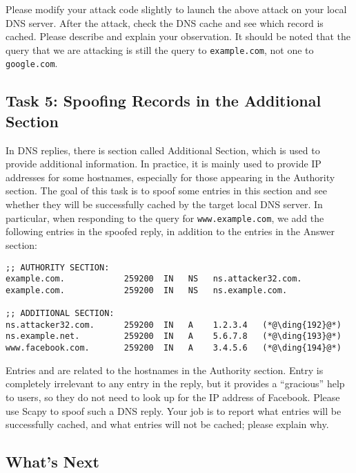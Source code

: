 Please modify your attack code slightly to launch 
the above attack on your local DNS server. After the 
attack, check the DNS cache and see which record is cached.
Please describe and explain your observation. It should be noted that the query
that we are attacking is still the query to \texttt{example.com}, not one
to \texttt{google.com}.  


\subsection{Task 5: Spoofing Records in the Additional Section}

In DNS replies, there is section called Additional Section, which is used
to provide additional information. In practice, it is mainly used to
provide IP addresses for some hostnames, especially for those appearing in the
Authority section. The goal of this task is to spoof some entries 
in this section and see whether they will be successfully cached by the
target local DNS server. In particular, when responding to 
the query for \texttt{www.example.com}, we add the following entries 
in the spoofed reply, in addition to the entries in the Answer section:


\begin{lstlisting}
;; AUTHORITY SECTION:
example.com.            259200  IN   NS   ns.attacker32.com.
example.com.            259200  IN   NS   ns.example.com.

;; ADDITIONAL SECTION:
ns.attacker32.com.      259200  IN   A    1.2.3.4   (*@\ding{192}@*)
ns.example.net.         259200  IN   A    5.6.7.8   (*@\ding{193}@*)
www.facebook.com.       259200  IN   A    3.4.5.6   (*@\ding{194}@*)
\end{lstlisting}

Entries  and  are related to the hostnames in
the Authority section. Entry  is completely irrelevant to
any entry in the reply, but it provides a ``gracious'' help to
users, so they do not need to look up for the IP address
of Facebook. Please use Scapy to spoof such a DNS reply. Your job is
to report what entries will be successfully cached, and what entries will
not be cached; please explain why. 
 

\subsection{What's Next}


